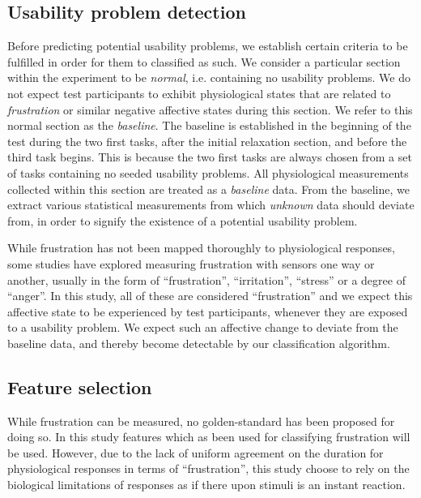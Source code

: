 \subsection{Usability problem detection}
Before predicting potential usability problems, we establish certain criteria to be fulfilled in order for them to
classified as such.  We consider a particular section within the experiment to be \textit{normal}, i.e. containing no
usability problems.  We do not expect test participants to exhibit physiological states that are related to
\textit{frustration} or similar negative affective states during this section. We refer to this normal section as the
\textit{baseline}. The baseline is established in the beginning of the test during the two first tasks, after the
initial relaxation section, and before the third task begins. This is because the two first tasks are always chosen from
a set of tasks containing no seeded usability problems. All physiological measurements collected within this section are
treated as a \textit{baseline} data.  From the baseline, we extract various statistical measurements from which
\textit{unknown} data should deviate from, in order to signify the existence of a potential usability problem.

While frustration has not been mapped thoroughly to physiological responses, some studies have explored measuring
frustration with sensors one way or another, usually in the form of ``frustration'', ``irritation'', ``stress'' or a
degree of ``anger''. In this study, all of these are considered ``frustration'' and we expect this affective state to be
experienced by test participants, whenever they are exposed to a usability problem. We expect such an affective change
to deviate from the baseline data, and thereby become detectable by our classification algorithm.

\subsection{Feature selection}
While frustration can be measured, no golden-standard has been proposed for doing so.  In this study features which as
been used for classifying frustration will be used.  However, due to the lack of uniform agreement on the duration for
physiological responses in terms of ``frustration'', this study choose to rely on the biological limitations of
responses as if there upon stimuli is an instant reaction.


